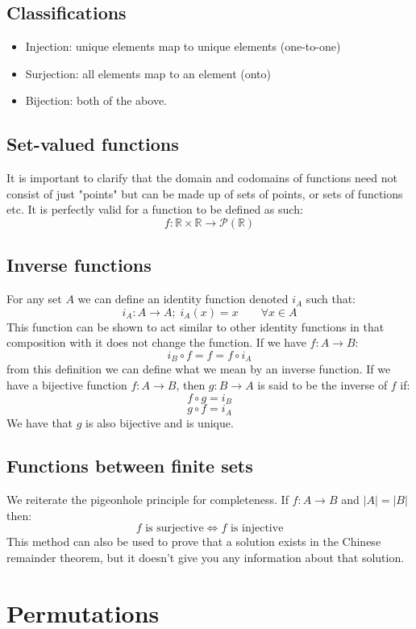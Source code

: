 \documentclass[12pt]{article}
\begin{document}
\subsection*{Classifications}
\begin{itemize}
    \item Injection: unique elements map to unique elements (one-to-one)
    \item Surjection: all elements map to an element (onto)
    \item Bijection: both of the above.
\end{itemize}
\subsection*{Set-valued functions}
It is important to clarify that the domain and codomains of functions need not consist of just "points" but can be made up of sets of points, or sets of functions etc. It is perfectly valid for a function to be defined as such:
\[f:\mathbb{R}\times\mathbb{R}\to\mathcal{P}(\mathbb{R})\]
\subsection*{Inverse functions}
For any set \(A\) we can define an identity function denoted \(i_A\) such that:
\[i_A:A\to A;\;i_A(x)=x\qquad\forall x\in A\]
This function can be shown to act similar to other identity functions in that composition with it does not change the function. If we have \(f:A\to B\):
\[i_B\circ f=f=f\circ i_A\]
from this definition we can define what we mean by an inverse function. If we have a bijective function \(f:A\to B\), then \(g:B\to A\) is said to be the inverse of \(f\) if:
\[f\circ g=i_B\]
\[g\circ f=i_A\]
We have that \(g\) is also bijective and is unique.
\subsection*{Functions between finite sets}
We reiterate the pigeonhole principle for completeness. If \(f:A\to B\) and \(\vert A\vert = \vert B \vert\) then:
\[f\text{ is surjective}\iff f \text{ is injective}\]
This method can also be used to prove that a solution exists in the Chinese remainder theorem, but it doesn't give you any information about that solution.
\section{Permutations}
\end{document}
